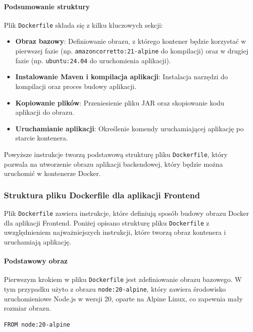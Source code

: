 \paragraph{Podsumowanie struktury}
Plik \texttt{Dockerfile} składa się z kilku kluczowych sekcji:
\begin{itemize}
    \item \textbf{Obraz bazowy}: Definiowanie obrazu, z którego kontener będzie korzystać w pierwszej fazie (np. \texttt{amazoncorretto:21-alpine} do kompilacji) oraz w drugiej fazie (np. \texttt{ubuntu:24.04} do uruchomienia aplikacji).
    \item \textbf{Instalowanie Maven i kompilacja aplikacji}: Instalacja narzędzi do kompilacji oraz proces budowy aplikacji.
    \item \textbf{Kopiowanie plików}: Przeniesienie pliku JAR oraz skopiowanie kodu aplikacji do obrazu.
    \item \textbf{Uruchamianie aplikacji}: Określenie komendy uruchamiającej aplikację po starcie kontenera.
\end{itemize}

Powyższe instrukcje tworzą podstawową strukturę pliku \texttt{Dockerfile}, który pozwala na utworzenie obrazu aplikacji backendowej, który będzie można uruchomić w kontenerze Docker.

\subsubsection{Struktura pliku Dockerfile dla aplikacji Frontend}

Plik \texttt{Dockerfile} zawiera instrukcje, które definiują sposób budowy obrazu Docker dla aplikacji Frontend. Poniżej opisano strukturę pliku \texttt{Dockerfile} z uwzględnieniem najważniejszych instrukcji, które tworzą obraz kontenera i uruchamiają aplikację.

\paragraph{Podstawowy obraz}
Pierwszym krokiem w pliku \texttt{Dockerfile} jest zdefiniowanie obrazu bazowego. W tym przypadku użyto z obrazu \texttt{node:20-alpine}, który zawiera środowisko uruchomieniowe Node.js w wersji 20, oparte na Alpine Linux, co zapewnia mały rozmiar obrazu.
\begin{lstlisting}[basicstyle=\footnotesize\ttfamily]
FROM node:20-alpine
\end{lstlisting}

